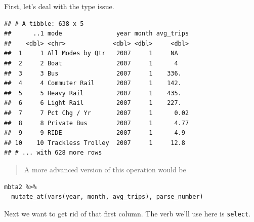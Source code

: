 \documentclass[12pt,letterpaperpaper,openany]{book}
\newenvironment{Shaded}{\begin{snugshade}}{\end{snugshade}}
\newcommand{\CommentTok}[1]{\textcolor[rgb]{0.56,0.35,0.01}{\textit{#1}}}
\newcommand{\DataTypeTok}[1]{\textcolor[rgb]{0.13,0.29,0.53}{#1}}
\newcommand{\DecValTok}[1]{\textcolor[rgb]{0.00,0.00,0.81}{#1}}
\newcommand{\KeywordTok}[1]{\textcolor[rgb]{0.13,0.29,0.53}{\textbf{#1}}}
\newcommand{\NormalTok}[1]{#1}
\newcommand{\OperatorTok}[1]{\textcolor[rgb]{0.81,0.36,0.00}{\textbf{#1}}}
\newcommand{\StringTok}[1]{\textcolor[rgb]{0.31,0.60,0.02}{#1}}
\begin{document}
First, let's deal with the type issue.

\begin{Shaded}
\end{Shaded}

\begin{verbatim}
## # A tibble: 638 x 5
##      ..1 mode               year month avg_trips
##    <dbl> <chr>             <dbl> <dbl>     <dbl>
##  1     1 All Modes by Qtr   2007     1     NA   
##  2     2 Boat               2007     1      4   
##  3     3 Bus                2007     1    336.  
##  4     4 Commuter Rail      2007     1    142.  
##  5     5 Heavy Rail         2007     1    435.  
##  6     6 Light Rail         2007     1    227.  
##  7     7 Pct Chg / Yr       2007     1      0.02
##  8     8 Private Bus        2007     1      4.77
##  9     9 RIDE               2007     1      4.9 
## 10    10 Trackless Trolley  2007     1     12.8 
## # ... with 628 more rows
\end{verbatim}

\begin{quote}
A more advanced version of this operation would be
\end{quote}

\begin{verbatim}
mbta2 %>% 
  mutate_at(vars(year, month, avg_trips), parse_number)
\end{verbatim}

Next we want to get rid of that first column. The verb we'll use here is \texttt{select}.

\begin{Shaded}
\end{Shaded}
\end{document}
